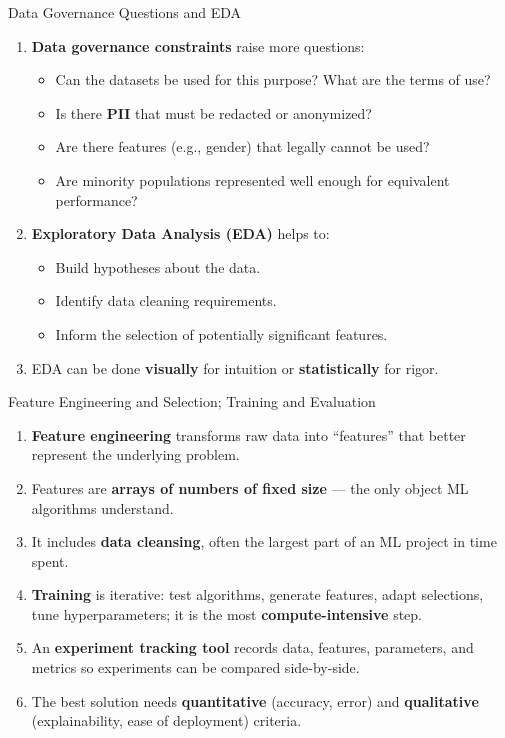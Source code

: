 \begin{frame}{Data Governance Questions and EDA}
\begin{enumerate}
\item<1-> \textbf{Data governance constraints} raise more questions:
    \begin{itemize}
    \item Can the datasets be used for this purpose? What are the terms of use?
    \item Is there \textbf{PII} that must be redacted or anonymized?
    \item Are there features (e.g., gender) that legally cannot be used?
    \item Are minority populations represented well enough for equivalent performance?
    \end{itemize}
\item<2-> \textbf{Exploratory Data Analysis (EDA)} helps to:
    \begin{itemize}
    \item Build hypotheses about the data.
    \item Identify data cleaning requirements.
    \item Inform the selection of potentially significant features.
    \end{itemize}
\item<3-> EDA can be done \textbf{visually} for intuition or \textbf{statistically} for rigor.
\end{enumerate}
\end{frame}

\begin{frame}{Feature Engineering and Selection; Training and Evaluation}
\begin{enumerate}
\item<1-> \textbf{Feature engineering} transforms raw data into ``features'' that better represent the underlying problem.
\item<2-> Features are \textbf{arrays of numbers of fixed size} --- the only object ML algorithms understand.
\item<3-> It includes \textbf{data cleansing}, often the largest part of an ML project in time spent.
\item<4-> \textbf{Training} is iterative: test algorithms, generate features, adapt selections, tune hyperparameters; it is the most \textbf{compute-intensive} step.
\item<5-> An \textbf{experiment tracking tool} records data, features, parameters, and metrics so experiments can be compared side-by-side.
\item<6-> The best solution needs \textbf{quantitative} (accuracy, error) and \textbf{qualitative} (explainability, ease of deployment) criteria.
\end{enumerate}
\end{frame}

